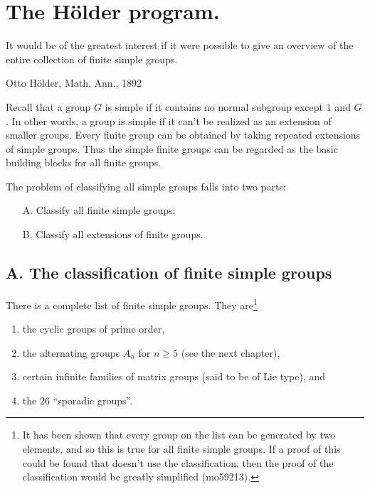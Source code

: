 \documentclass[a4paper,11pt,final,openany]{memoir}%
\theoremstyle{nonumberplain}
\begin{document}
\section{The H\"{o}lder program.}

\setlength{\epigraphwidth}{3in} \setlength{\epigraphrule}{0pt}
\epigraph{It would be of the greatest interest if it were possible to give an overview of the entire
collection of finite simple groups.}{Otto H\"older, Math. Ann., 1892}

Recall that a group $G$ is simple if it contains no normal subgroup except $1
$ and $G$. In other words, a group is simple if it can't be realized as an
extension of smaller groups. Every finite group can be obtained by taking
repeated extensions of simple groups. Thus the simple finite groups can be
regarded as the basic building blocks for all finite groups.

The problem of classifying all simple groups falls into two parts:

\begin{itemize}
\item[A.] Classify all finite simple groups;

\item[B.] Classify all extensions of finite groups.
\end{itemize}

\subsection{A. The classification of finite simple groups}

\label{classification}There is a complete list of finite simple groups. They
are\footnote{It has been shown that every group on the list can be generated
by two elements, and so this is true for all finite simple groups. If a proof
of this could be found that doesn't use the classification, then the proof of
the classification would be greatly simplified (mo59213).}

\begin{enumerate}
\item the cyclic groups of prime order,

\item the alternating groups $A_{n}$ for $n\geq5$ (see the next chapter),

\item certain infinite families of matrix groups (said to be of Lie type), and

\item the $26$ \textquotedblleft sporadic groups\textquotedblright.
\end{enumerate}
\end{document}
